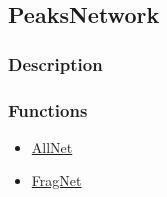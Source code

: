 \subsection{PeaksNetwork}\label{PeaksNetwork}
\subsubsection{Description}


\subsubsection{Functions}
\begin{itemize}
\item \hyperref[AllNet]{AllNet}
\item \hyperref[FragNet]{FragNet}
\end{itemize}

